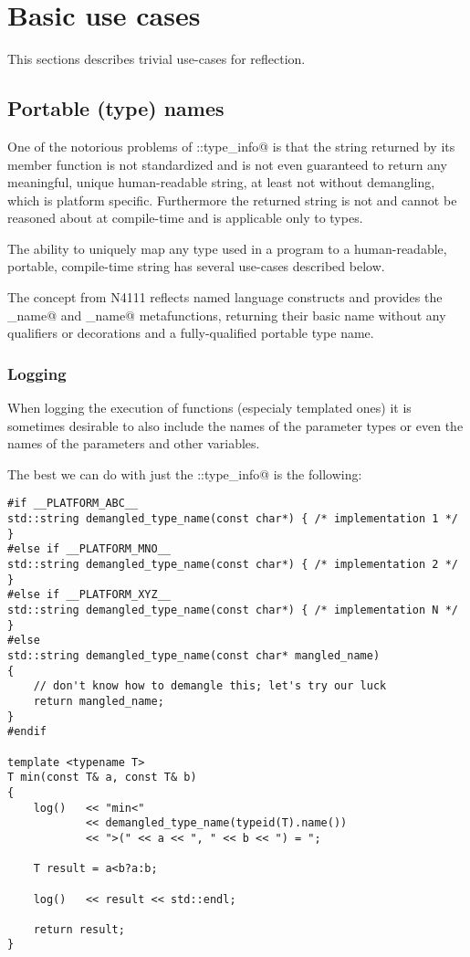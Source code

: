 \section{Basic use cases}

This sections describes trivial use-cases for reflection.

\subsection{Portable (type) names}

One of the notorious problems of \verb@std::type_info@ is that the string
returned by its \verb@name@ member function is not standardized and is
not even guaranteed to return any meaningful, unique human-readable string,
at least not without demangling, which is platform specific.
Furthermore the returned string is not \verb@constexpr@ and cannot be
reasoned about at compile-time and is applicable only to types.

The ability to uniquely map any type used in a program to a human-readable,
portable, compile-time string has several use-cases described below.

The  concept from N4111 reflects named language constructs
and provides the \verb@base_name@ and \verb@full_name@ metafunctions,
returning their basic name without any qualifiers or decorations and a fully-qualified 
portable type name.

\subsubsection{Logging}

When logging the execution of functions (especialy templated ones) it is sometimes
desirable to also include the names of the parameter types or even the names of the parameters
and other variables.

The best we can do with just the \verb@std::type_info@ is the following:

\begin{verbatim}
#if __PLATFORM_ABC__
std::string demangled_type_name(const char*) { /* implementation 1 */ }
#else if __PLATFORM_MNO__
std::string demangled_type_name(const char*) { /* implementation 2 */ }
#else if __PLATFORM_XYZ__
std::string demangled_type_name(const char*) { /* implementation N */ }
#else
std::string demangled_type_name(const char* mangled_name)
{
	// don't know how to demangle this; let's try our luck
	return mangled_name;
}
#endif

template <typename T>
T min(const T& a, const T& b)
{
	log()   << "min<"
	        << demangled_type_name(typeid(T).name())
	        << ">(" << a << ", " << b << ") = ";

	T result = a<b?a:b;

	log()   << result << std::endl;

	return result;
}

\end{verbatim}

